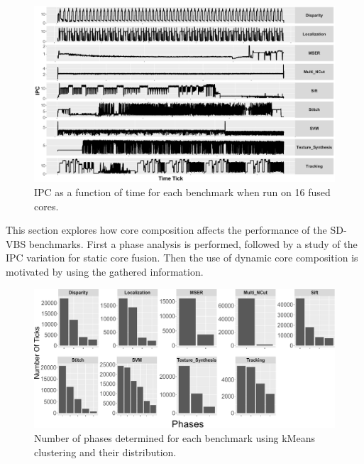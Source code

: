 
\begin{figure}
    \centering
    \includegraphics[width=1\textwidth]{cases-paper/graphics/Exploration/ipcs_16_2.pdf}
    \caption{IPC as a function of time for each benchmark when run on 16 fused cores.}
    \label{fig:sxt}
	\vspace{1em}
\end{figure}

This section explores how core composition affects the performance of the SD-VBS benchmarks.
First a phase analysis is performed, followed by a study of the IPC variation for static core fusion.
Then the use of dynamic core composition is motivated by using the gathered information.

\begin{figure}[t]
    \centering
    \includegraphics[width=1\textwidth]{cases-paper/graphics/Exploration/clusters3.pdf}
    \caption{Number of phases determined for each benchmark using kMeans clustering and their distribution.}
    \label{fig:clust}
		\vspace{5mm}
\end{figure}



